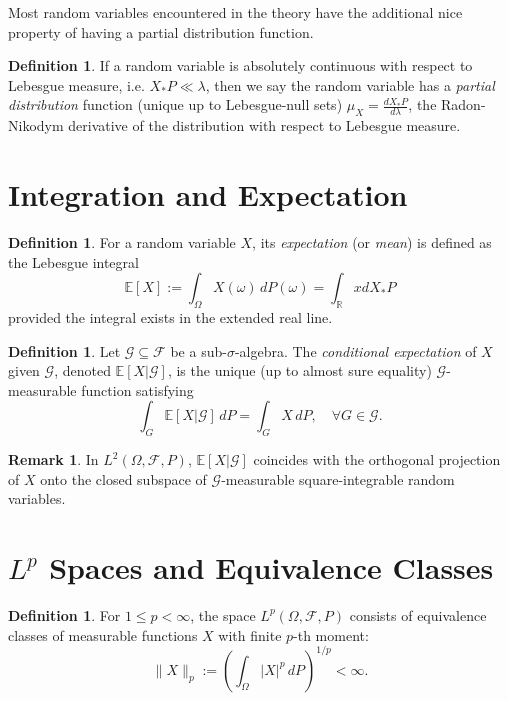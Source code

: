 \documentclass[11pt]{amsart}
\theoremstyle{definition}
\newtheorem{definition}[theorem]{Definition}
\newtheorem{remark}[theorem]{Remark}
\theoremstyle{remark}
\begin{document}
Most random variables encountered in the theory have the additional nice property of having a partial distribution function.

\begin{definition}
	If a random variable is absolutely continuous with respect to Lebesgue measure, i.e. \(X_{*}P \ll \lambda\), then we say the random variable has a \emph{partial distribution} function (unique up to Lebesgue-null sets) \(\mu_{X} = \frac{d X_{*}P}{d\lambda}\), the Radon-Nikodym derivative of the distribution with respect to Lebesgue measure.
\end{definition}

\section{Integration and Expectation}

\begin{definition}
	For a random variable $X$, its \emph{expectation} (or \emph{mean}) is defined as the Lebesgue integral
	\[
		\mathbb{E}[X]
		:= \int_\Omega X(\omega) \, dP(\omega)
		= \int_{\mathbb{R}} x dX_*P
	\]
	provided the integral exists in the extended real line.
\end{definition}

\begin{definition}
	Let $\mathcal{G} \subseteq \mathcal{F}$ be a sub-$\sigma$-algebra. The \emph{conditional expectation} of $X$ given $\mathcal{G}$, denoted $\mathbb{E}[X|\mathcal{G}]$, is the unique (up to almost sure equality) $\mathcal{G}$-measurable function satisfying
	\[
		\int_G \mathbb{E}[X|\mathcal{G}] \, dP = \int_G X \, dP, \quad \forall G \in \mathcal{G}.
	\]
\end{definition}

\begin{remark}
	In $L^2(\Omega, \mathcal{F}, P)$, $\mathbb{E}[X|\mathcal{G}]$ coincides with the orthogonal projection of $X$ onto the closed subspace of $\mathcal{G}$-measurable square-integrable random variables.
\end{remark}

\section{\texorpdfstring{$L^p$}{Lp} Spaces and Equivalence Classes}

\begin{definition}
	For $1 \leq p < \infty$, the space $L^p(\Omega, \mathcal{F}, P)$ consists of equivalence classes of measurable functions $X$ with finite $p$-th moment:
	\[
		\|X\|_p := \left( \int_\Omega |X|^p \, dP \right)^{1/p} < \infty.
	\]
\end{definition}
\end{document}
